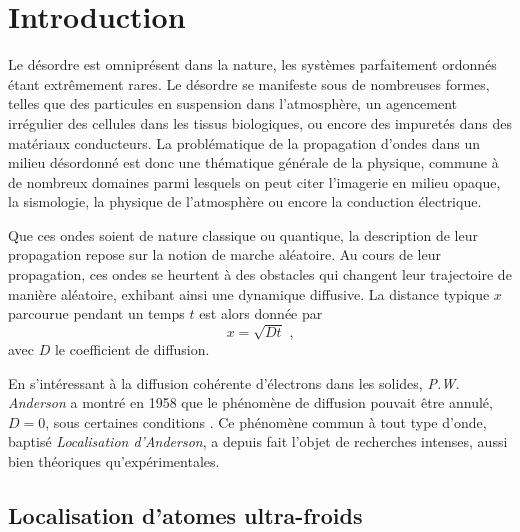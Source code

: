 
\chapter{Introduction}

Le désordre est omniprésent dans la nature, les systèmes parfaitement ordonnés étant extrêmement rares. Le désordre se manifeste sous de nombreuses formes, telles que des particules en suspension dans l'atmosphère, un agencement irrégulier des cellules dans les tissus biologiques, ou encore des impuretés dans des matériaux conducteurs. La problématique de la propagation d'ondes dans un milieu désordonné est donc une thématique générale de la physique, commune à de nombreux domaines parmi lesquels on peut citer l'imagerie en milieu opaque, la sismologie, la physique de l'atmosphère ou encore la conduction électrique. 

Que ces ondes soient de nature classique ou quantique, la description de leur propagation repose sur la notion de marche aléatoire. Au cours de leur propagation, ces ondes se heurtent à des obstacles qui changent leur trajectoire de manière aléatoire, exhibant ainsi une dynamique diffusive. La distance typique $x$ parcourue pendant un temps $t$ est alors donnée par
\begin{equation}
x=\sqrt{Dt} \text{ ,}
\end{equation}
avec $D$ le coefficient de diffusion. 

En s'intéressant à la diffusion cohérente d'électrons dans les solides, \emph{P.W. Anderson} a montré en 1958 que le phénomène de diffusion pouvait être annulé, $D=0$, sous certaines conditions \citep{anderson1958absence}. Ce phénomène commun à tout type d'onde, baptisé \emph{Localisation d'Anderson}, a depuis fait l'objet de recherches intenses, aussi bien théoriques qu'expérimentales. 


\section{Localisation d'atomes ultra-froids}

